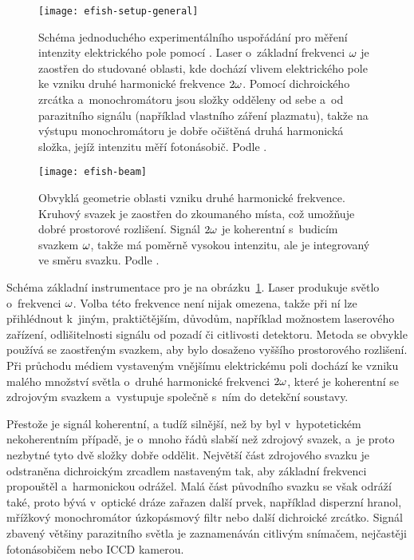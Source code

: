 \begin{figure}[p]
	\centering
	\texttt{[image: efish-setup-general]}
	\caption{Schéma jednoduchého experimentálního uspořádání pro měření
		intenzity elektrického pole pomocí \EFISH{}.
		Laser o~základní frekvenci $\omega$ je zaostřen do studované
		oblasti, kde dochází vlivem elektrického pole ke vzniku
		druhé harmonické frekvence $2\omega$.
		Pomocí dichroického zrcátka a~monochromátoru jsou složky
		odděleny od sebe a~od parazitního signálu
		(například vlastního záření plazmatu),
		takže na výstupu monochromátoru je dobře očištěná druhá harmonická
		složka, jejíž intenzitu měří fotonásobič.
		Podle \cite{efish-2018}.}
	\label{fig:efish-setup-general}
\end{figure}

\begin{figure}[p]
	\centering
	\texttt{[image: efish-beam]}
	\caption{Obvyklá geometrie oblasti vzniku druhé harmonické frekvence.
		Kruhový svazek je zaostřen do zkoumaného místa,
		což umožňuje dobré prostorové rozlišení.
		Signál $2\omega$ je koherentní s~budicím svazkem $\omega$,
		takže má poměrně vysokou intenzitu,
		ale je integrovaný ve směru svazku.
		Podle \cite{efish-focusing, efish-lecture}.}
	\label{fig:efish-beam}
\end{figure}

Schéma základní instrumentace pro \EFISH{} je
na obrázku~\ref{fig:efish-setup-general}.
Laser produkuje světlo o~frekvenci $\omega$.
Volba této frekvence není nijak omezena, takže při ní lze přihlédnout
k~jiným, praktičtějším, důvodům, například možnostem laserového zařízení,
odlišitelnosti signálu od pozadí či citlivosti detektoru.
Metoda se obvykle používá se zaostřeným svazkem,
aby bylo dosaženo vyššího prostorového rozlišení.
Při průchodu médiem vystaveným vnějšímu elektrickému poli dochází
ke vzniku malého množství světla o~druhé harmonické frekvenci $2\omega$,
které je koherentní se zdrojovým svazkem a~vystupuje společně s~ním
do detekční soustavy.

Přestože je signál koherentní, a tudíž silnější,
než by byl v~hypotetickém nekoherentním případě,
je o~mnoho řádů slabší než zdrojový svazek, a~je proto nezbytné
tyto dvě složky dobře oddělit.
Největší část zdrojového svazku je odstraněna dichroickým zrcadlem
nastaveným tak, aby základní frekvenci propouštěl a~harmonickou odrážel.
Malá část původního svazku se však odráží také, proto bývá v~optické dráze
zařazen další prvek, například disperzní hranol, mřížkový monochromátor
úzkopásmový filtr nebo další dichroické zrcátko.
Signál zbavený většiny parazitního světla je zaznamenáván citlivým snímačem,
nejčastěji fotonásobičem nebo ICCD kamerou.

